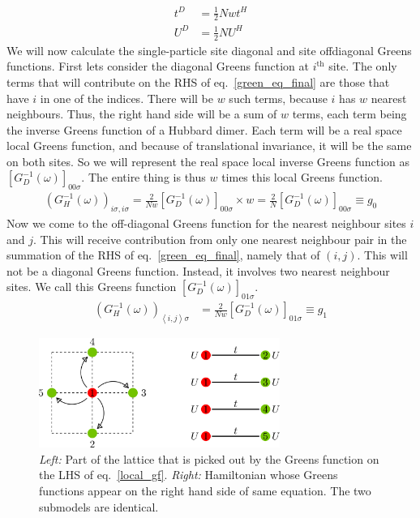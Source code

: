 \documentclass[12pt]{article}
\numberwithin{equation}{section}
\begin{document}
\begin{equation}\begin{aligned}
	t^D &= \frac{1}{2}Nwt^H\\
	U^D &= \frac{1}{2}N U^H
\end{aligned}\end{equation}
We will now calculate the single-particle site diagonal and site offdiagonal Greens functions. First lets consider the diagonal Greens function at $i^\text{th}$ site. The only terms that will contribute on the RHS of eq.~\ref{green_eq_final} are those that have $i$ in one of the indices. There will be $w$ such terms, because $i$ has $w$ nearest neighbours. Thus, the right hand side will be a sum of $w$ terms, each term being the inverse Greens function of a Hubbard dimer. Each term will be a real space local Greens function, and because of translational invariance, it will be the same on both sites. So we will represent the real space local inverse Greens function as $\left[G_D^{-1}(\omega)\right]_{00\sigma}$. The entire thing is thus $w$ times this local Greens function.
\begin{equation}\begin{aligned}
	\label{local_gf}
	\left(G_{H}^{-1}(\omega)\right)_{i\sigma,i\sigma} = \frac{2}{Nw}\left[G_{D}^{-1}(\omega)\right]_{00\sigma}\times w = \frac{2}{N}\left[G_{D}^{-1}(\omega)\right]_{00\sigma} \equiv g_0
\end{aligned}\end{equation}
Now we come to the off-diagonal Greens function for the nearest neighbour sites $i$ and $j$. This will receive contribution from only one nearest neighbour pair in the summation of the RHS of eq.~\ref{green_eq_final}, namely that of $\left(i,j\right)$. This will not be a diagonal Greens function. Instead, it involves two nearest neighbour sites. We call this Greens function $\left[G_D^{-1}(\omega)\right]_{01\sigma}$.
\begin{equation}\begin{aligned}
\label{nn_gf}
	\left(G_{H}^{-1}(\omega)\right)_{\left<i,j \right>\sigma} &= \frac{2}{Nw}\left[G_{D}^{-1}(\omega)\right]_{01\sigma} \equiv g_1
\end{aligned}\end{equation}
\begin{figure}[htpb!]
	\centering
	\hspace*{\fill}
	\includegraphics[width=0.7\textwidth]{./lattice.png}
	\hspace*{\fill}
	\caption{\textit{Left:} Part of the lattice that is picked out by the Greens function on the LHS of eq.~\ref{local_gf}. \textit{Right:} Hamiltonian whose Greens functions appear on the right hand side of same equation. The two submodels are identical.}
	\label{fig:}
\end{figure}
\end{document}
